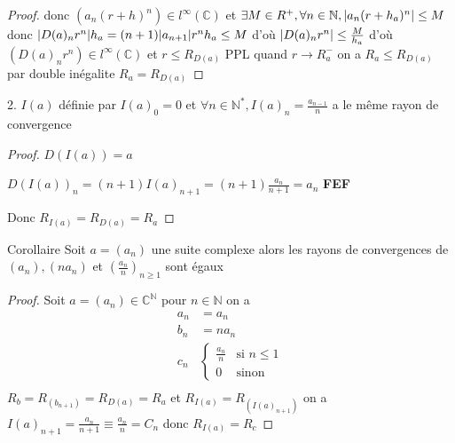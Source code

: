 \documentclass[11pt,hidelinks]{book}
\theoremstyle{mytheoremstyle}
\theoremstyle{mytheoremstyle}
\theoremstyle{mytheoremstyle}
\theoremstyle{mytheoremstyle}
\theoremstyle{mytheoremstyle}
\theoremstyle{mytheoremstyle}
\theoremstyle{mytheoremstyle}
\theoremstyle{mytheoremstyle}
\theoremstyle{myproblemstyle}
\def\mbb#1{\mathbb{#1}}
\def\bN{\mbb{N}}
\def\bC{\mbb{C}}
\def\born{l^{\infty}\left( \bC \right)}
\def\fef{\textbf{FEF}}
\newcommand{\deq}[3]{\begin{cases}
    #1 & \text{si } #2 \\
    #3 & \text{sinon}
\end{cases}}
\begin{document}
\begin{adjustwidth}{-2em}{-1em}
\begin{prop}
\begin{enumerate}
\begin{itemize}
\begin{proof}
                donc $(a_n(r+h)^n) \in \born$ et $\exists M \in R^+, \forall n \in \bN, \abs{a_n (r+h_a)^n} \leq M$ \newline 
                donc $\abs{D(a)_n r^n}h_a = (n+1)\abs{a_{n+1}}r^n h_a \leq M$ 
                d'où $\abs{D(a)_n r^n} \leq \frac{M}{h_a}$ d'où $(D(a)_n r^n) \in \born$ et $r \leq R_{D(a)}$ 
                 PPL quand $r \to R_a^-$ on a $R_a \leq R_{D(a)}$
                 par double inégalite $R_a = R_{D(a)}$
            \end{proof}
        \end{itemize}
            2. $I(a)$ définie par $I(a)_0 = 0$ et $\forall n \in \bN^*, I(a)_n = \frac{a_{n-1}}{n}$ a le même rayon de convergence
            \begin{proof}
                $D(I(a)) = a$ 
                \begin{ef}
                    $D(I(a))_n = (n+1)I(a)_{n+1} = (n+1) \frac{a_n}{n+1} = a_n$
                    \fef 
                \end{ef}
                Donc $R_{I(a)} = R_{D(a)} = R_a$
            \end{proof}
        \end{enumerate}
    \end{prop}
    \begin{prop}{Corollaire}
        \newline
        Soit $a = (a_n)$ une suite complexe alors les rayons de convergences de 
        $(a_n), (na_n)$ et $\left(\frac{a_n}{n}\right)_{n \geq 1}$ sont égaux
        \begin{proof}
            Soit $a = (a_n) \in \bC^{\bN}$ pour $n \in \bN$ 
            on a 
            \begin{align*}
                a_n &= a_n \\
                b_n &= n a_n \\
                c_n &\deq{\frac{a_n}{n}}{n \leq 1}{0} \\
            \end{align*}
            $R_b = R_{(b_{n+1})} = R_{D(a)} = R_a$ et $R_{I(a)} = R_{(I(a)_{n+1})}$
            on a 
            $I(a)_{n+1} = \frac{a_n}{n+1} \equiv \frac{a_n}{n} = C_n$ donc $R_{I(a)} = R_c$
        \end{proof}
    \end{prop}
\end{adjustwidth}
\end{document}
